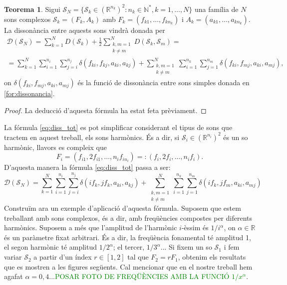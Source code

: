 \documentclass{article}
\theoremstyle{definition}
\newtheorem{theorem}[definition]{Teorema}
\begin{document}
\begin{theorem}
Sigui $\mathcal{S}_N=\{\mathcal{S}_k\in(\mathbb{R}^{n_k})^2:n_k\in\mathbb{N}^*,k=1,\ldots, N\}$ una família de $N$ sons complexos $\mathcal{S}_k=(F_k, A_k)$ amb $F_k=(f_{k1},\ldots, f_{kn_k})$ i $A_k=(a_{k1},\ldots, a_{kn_k})$. La dissonància entre aquests sons vindrà donada per 
\begin{multline}
    \mathcal{D}(\mathcal{S}_N)=\sum_{k=1}^ND(\mathcal{S}_k)+\frac{1}{2}\sum_{\substack{k, m=1\\ k\ne m}}^ND(\mathcal{S}_k, \mathcal{S}_m)=\\=\sum_{k=1}^N\sum_{i=1}^{n_i}\sum_{j=i}^{n_j}\delta(f_{ki}, f_{kj}, a_{ki}, a_{kj})+\sum_{\substack{k, m=1\\ k\ne m}}^N\sum_{i=1}^{n_k}\sum_{j=1}^{n_m}\delta(f_{ki}, f_{mj}, a_{ki}, a_{mj}),
    \label{eq:diss_tot}
\end{multline}
on $\delta(f_{ki}, f_{mj}, a_{ki}, a_{mj})$ és la funció de dissonància entre sons simples donada en \eqref{for:dissonancia}.
\end{theorem}
\begin{proof}
La deducció d'aquesta fórmula ha estat feta prèviament.
\end{proof}
La fórmula \eqref{eq:diss_tot} es pot simplificar considerant el tipus de sons que tractem en aquest treball, els sons harmònics. És a dir, si $\mathcal{S}_i\in(\mathbb{R}^{n_i})^2$ és un so harmònic, llavors es compleix que $$F_i=(f_{i1},2f_{i1},\ldots, n_if_{in_i})=:(f_i,2f_i,\ldots, n_if_i).$$ D'aquesta manera la fórmula \eqref{eq:diss_tot} passa a ser: 
\begin{equation}
    \mathcal{D}(\mathcal{S}_N)=\sum_{k=1}^N\sum_{i=1}^{n_i}\sum_{j=i}^{n_j}\delta(if_k, jf_k, a_{ki}, a_{kj})+\sum_{\substack{k, m=1\\ k\ne m}}^N\sum_{i=1}^{n_k}\sum_{j=1}^{n_m}\delta(if_k, jf_m, a_{ki}, a_{mj})
\end{equation}
Construïm ara un exemple d'aplicació d'aquesta fórmula. Suposem que estem treballant amb sons complexos, és a dir, amb freqüències compostes per diferents harmònics. Suposem a més que l'amplitud de l'harmònic $i$-èssim és $1/i^\alpha$, on $\alpha\in\mathbb{R}$ és un paràmetre fixat arbitrari. És a dir, la freqüència fonamental té amplitud 1, el segon harmònic té amplitud $1/2^\alpha$; el tercer, $1/3^\alpha$... Si fixem un so $\mathcal{S}_1$ i fem variar $\mathcal{S}_2$ a partir d'un índex $r\in[1,2]$ tal que $F_2=rF_1$, obtenim els resultats que es mostren a les figures següents. Cal mencionar que en el nostre treball hem agafat $\alpha=0,4$...\textcolor{green}{POSAR FOTO DE FREQÜÈNCIES AMB LA FUNCIÓ $1/x^\alpha$}.
\end{document}
